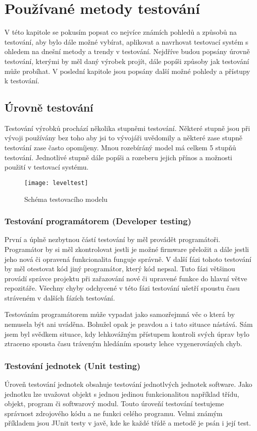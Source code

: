 \chapter{Používané metody testování}
V této kapitole se pokusím popsat co nejvíce známích pohledů a způsobů na testování, aby bylo dále možné vybírat, aplikovat a navrhovat testovací systém s ohledem na dnešní metody a trendy v testování. Nejdříve budou popsány úrovně testování, kterými by měl daný výrobek projít, dále popíši způsoby jak testování může probíhat. V poslední kapitole jsou popsány další možné pohledy a přístupy k testování.

\section{Úrovně testování}
Testování výrobků prochází několika stupněmi testování. Některé stupně jsou při vývoji používány bez toho aby jsi to vývojáři uvědomily a některé zase stupně testování zase často opomíjeny. Mnou rozebíráný model má celkem 5 stupňů testování.  Jednotlivé stupně dále popíši a rozeberu jejich přínos a možnosti použití v testovací systému.

\begin{figure}[h]
  \centering
  \texttt{[image: leveltest]}
  \caption{Schéma testovacího modelu}
  \label{fig:leveltest}
\end{figure}

\subsection{Testování programátorem (Developer testing)}
První a úplně nezbytnou částí testování by měl provádět programátoři. Programátor by si měl zkontrolovat jestli je možné firmware přeložit a dále jestli jeho nová či opravená funkcionalita funguje správně. V další fázi tohoto testování by měl otestovat kód jiný programátor, který kód nepsal. Tuto fázi většinou provádí správce projektu při zařazování nové či upravené funkce do hlavní větve repozitáře. Všechny chyby odchycené v této fázi testování ušetří spoustu času stráveném v dalších fázích testování.

Testováním programátorem může vypadat jako samozřejmná věc o která by nemusela být ani uváděna. Bohužel opak je pravdou a i tato situace nástává. Sám jsem byl svědkem situace, kdy lehkovážným přístupem kontroli svých úprav bylo ztraceno spousta času tráveným hledáním spousty lehce vygenerováných chyb.

\subsection{Testování jednotek (Unit testing)}
Úroveň testování jednotek obsahuje testování jednotlvých jednotek software. Jako jednotku lze uvažovat objekt s jednou jedinou funkcionalitou například třídu, objekt, program či softwarový modul. Touto úroveňí testování testujeme správnost zdrojového kódu a ne funkci celého programu. Velmi známým příkladem jsou JUnit testy v javě, kde ke každé třídě a metodě je psán i její test.

